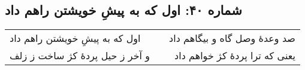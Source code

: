 \begin{center}
\section*{شماره ۴۰: اول که به پیشِ خویشتن راهم داد}
\label{sec:040}
\begin{longtable}{l p{0.5cm} r}
اول که به پیشِ خویشتن راهم داد
&&
صد وعدهٔ وصل گاه و بیگاهم داد
\\
و آخر ز حیل پردهٔ کژ ساخت ز زلف
&&
یعنی که ترا پردهٔ کژ خواهم داد
\\
\end{longtable}
\end{center}
